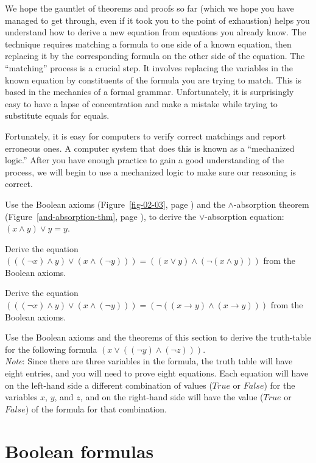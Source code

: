 We hope the gauntlet of theorems and proofs so far
(which we hope you have managed to get through,
even if it took you to the point of exhaustion)
helps you understand how to derive a new equation from equations you already know.
The technique requires matching a formula to one side of a known equation,
then replacing it by the corresponding formula on the other side
of the equation.
The ``matching'' process is a crucial step.
It involves replacing the variables in the known equation
by constituents of the formula you are trying to match.
This is based in the mechanics of a formal grammar.
Unfortunately, it is surprisingly easy
to have a lapse of concentration and make a mistake
while trying to substitute equals for equals.

Fortunately, it is easy for computers to verify
correct matchings and report erroneous ones.
A computer system that does this is known as a ``mechanized logic.''
After you have enough practice to gain a good understanding of the process,
we will begin to use a mechanized logic to make sure our reasoning is correct.

\begin{ExerciseList}
\Exercise
Use the Boolean axioms (Figure~\ref{fig-02-03}, page \pageref{fig-02-03})
and the $\wedge$-absorption theorem
(Figure~\ref{and-absorption-thm}, page \pageref{and-absorption-thm}),
to derive the $\vee$-absorption equation: $(x \wedge y) \vee y = y$.

\Exercise
Derive the equation
$(((\neg x) \wedge y) \vee (x \wedge (\neg y))) = ((x \vee y) \wedge (\neg(x \wedge y)))$
from the Boolean axioms.

\Exercise
Derive the equation
$(((\neg x) \wedge y) \vee (x \wedge (\neg y))) = (\neg((x \rightarrow y) \wedge (x \rightarrow y)))$
from the Boolean axioms.

\Exercise
Use the Boolean axioms
and the theorems of this section to
derive the truth-table for the following formula $(x \vee ((\neg y) \wedge (\neg z)))$.\\
\emph{Note}: Since there are three variables in the formula, the truth table
will have eight entries, and you will need to prove eight equations.
Each equation will have on the left-hand side
a different combination of values ($True$ or $False$) for the variables $x$, $y$, and $z$,
and on the right-hand side will have the value ($True$ or $False$) of the formula for that combination.
\end{ExerciseList}

\section{Boolean formulas}
\label{sec:boolean-formuas}


